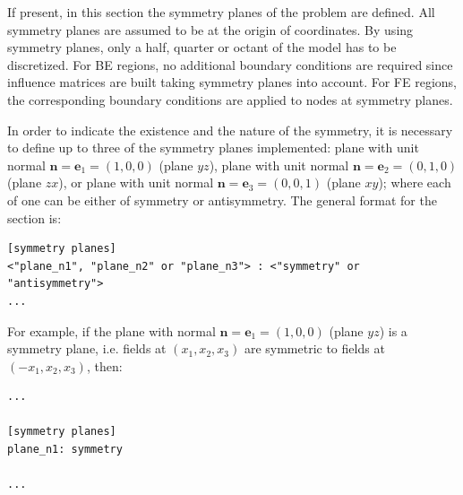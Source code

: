\documentclass[a4paper,fleqn]{book}
\begin{document}
If present, in this section the symmetry planes of the problem are defined. All symmetry planes are assumed to be at the origin of coordinates. By using symmetry planes, only a half, quarter or octant of the model has to be discretized. For BE regions, no additional boundary conditions are required since influence matrices are built taking symmetry planes into account. For FE regions, the corresponding boundary conditions are applied to nodes at symmetry planes.

In order to indicate the existence and the nature of the symmetry, it is necessary to define up to three of the symmetry planes implemented: plane with unit normal $\mathbf{n}=\mathbf{e}_1=(1,0,0)$ (plane $yz$), plane with unit normal $\mathbf{n}=\mathbf{e}_2=(0,1,0)$ (plane $zx$), or plane with unit normal $\mathbf{n}=\mathbf{e}_3=(0,0,1)$ (plane $xy$); where each of one can be either of symmetry or antisymmetry. The general format for the section is:
\begin{Verbatim}[frame=single, fontsize=\small, label={general format of section [symmetry planes]}]
[symmetry planes]
<"plane_n1", "plane_n2" or "plane_n3"> : <"symmetry" or "antisymmetry">
...
\end{Verbatim} 
For example, if the plane with normal $\mathbf{n}=\mathbf{e}_1=(1,0,0)$ (plane $yz$) is a symmetry plane, i.e. fields at $(x_1,x_2,x_3)$ are symmetric to fields at $(-x_1,x_2,x_3)$, then:
\begin{Verbatim}[frame=single, fontsize=\small, label={input.dat}]
...

[symmetry planes]
plane_n1: symmetry

...
\end{Verbatim}
\end{document}
